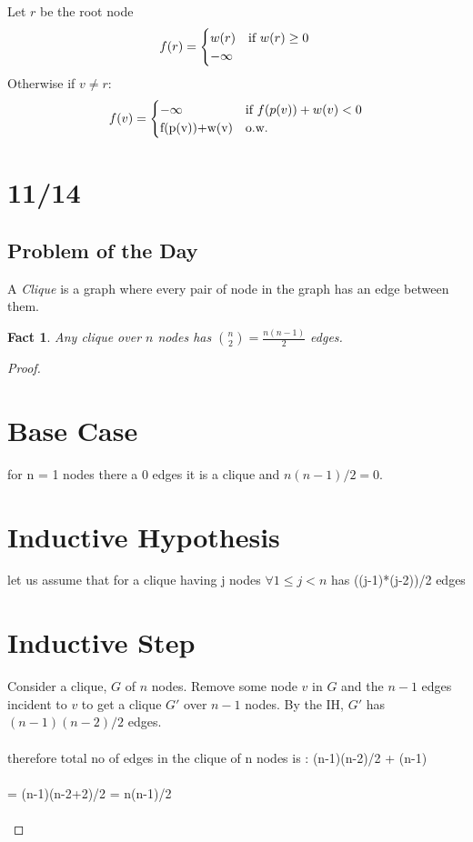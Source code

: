 \documentclass{article}
\newtheorem{fact}{Fact}
\begin{document}
Let $r$ be the root node
\[
f(r) = 
\begin{cases}
    w(r) & \text{if $w(r) \geq 0$}\\
    -\infty
\end{cases}\\
\]
Otherwise if $v \neq r$:
\[
f(v)=
    \begin{cases}
        -\infty & \text{if $f(p(v)) + w(v) < 0$}\\
        $f(p(v))+w(v)$ & \text{o.w.}
    \end{cases}
\]





\section{11/14}

\subsection{Problem of the Day}
A \emph{Clique} is a graph where every pair of node in the graph has an edge between them.

\begin{fact}
Any clique over $n$ nodes has ${n \choose 2} = \frac{n(n-1)}{2}$ edges.
\end{fact}

\begin{proof}
    \section*{Base Case}
    for n = 1 nodes there a 0 edges it is a clique and $n(n-1)/2 = 0$.
    \section*{Inductive Hypothesis}
    let us assume that for a clique having j nodes $\forall 1 \leq j < n $ has ((j-1)*(j-2))/2 edges 
    \section*{Inductive Step}
    Consider a clique, $G$ of $n$ nodes.  Remove some node $v$ in $G$ and the $n-1$ edges incident to $v$ to get a clique $G'$ over $n-1$ nodes.  By the IH, $G'$ has $(n-1)(n-2)/2$ edges.\\\\
    therefore total no of edges in the clique of n nodes is : (n-1)(n-2)/2 + (n-1) \\\\
    = (n-1)(n-2+2)/2 = n(n-1)/2 \\\\
\end{proof}
\end{document}
